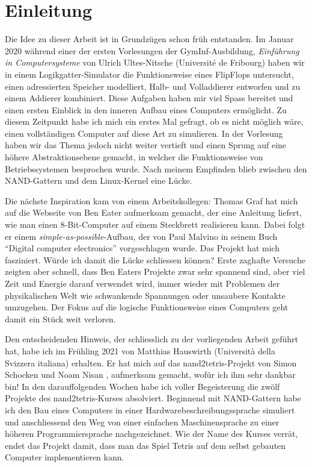 \section*{Einleitung}

Die Idee zu dieser Arbeit ist in Grundzügen schon früh entstanden. Im Januar 2020 während einer der ersten Vorlesungen der GymInf-Ausbildung, \textit{Einführung in Computersysteme} von Ulrich Ultes-Nitsche (Université de Fribourg) haben wir in einem Logikgatter-Simulator die Funktionsweise eines FlipFlops untersucht, einen adressierten Speicher modelliert, Halb- und Volladdierer entworfen und zu einem Addierer kombiniert. Diese Aufgaben haben mir viel Spass bereitet und einen ersten Einblick in den inneren Aufbau eines Computers ermöglicht. Zu diesem Zeitpunkt habe ich mich ein erstes Mal gefragt, ob es nicht möglich wäre, einen vollständigen Computer auf diese Art zu simulieren. In der Vorlesung haben wir das Thema jedoch nicht weiter vertieft und einen Sprung auf eine höhere Abstraktionsebene gemacht, in welcher die Funktionsweise von Betriebssystemen besprochen wurde. Nach meinem Empfinden blieb zwischen den NAND-Gattern und dem Linux-Kernel eine Lücke.

Die nächste Inspiration kam von einem Arbeitskollegen: Thomas Graf hat mich auf die Webseite von Ben Eater \cite{ben-eater} aufmerksam gemacht, der eine Anleitung liefert, wie man einen 8-Bit-Computer auf einem Steckbrett realisieren kann. Dabei folgt er einem \textit{simple-as-possible}-Aufbau, der von Paul Malvino in seinem Buch \enquote{Digital computer electronics} \cite{malvino} vorgeschlagen wurde. Das Projekt hat mich fasziniert. Würde ich damit die Lücke schliessen können? Erste zaghafte Versuche zeigten aber schnell, dass Ben Eaters Projekte zwar sehr spannend sind, aber viel Zeit und Energie darauf verwendet wird, immer wieder mit Problemen der physikalischen Welt wie schwankende Spannungen oder unsaubere Kontakte umzugehen. Der Fokus auf die logische Funktionsweise eines Computers geht damit ein Stück weit verloren. 

Den entscheidenden Hinweis, der schliesslich zu der vorliegenden Arbeit geführt hat, habe ich im Frühling 2021 von Matthias Hauswirth (Università della Svizzera italiana) erhalten. Er hat mich auf das nand2tetris-Projekt von Simon Schocken und Noam Nisan \cite{nand2tetris-url}, \cite{nand2tetris} aufmerksam gemacht, wofür ich ihm sehr dankbar bin! In den darauffolgenden Wochen habe ich voller Begeisterung die zwölf Projekte des nand2tetris-Kurses absolviert. Beginnend mit NAND-Gattern habe ich den Bau eines Computers in einer Hardwarebeschreibungssprache simuliert und anschliessend den Weg von einer einfachen Maschinensprache zu einer höheren Programmiersprache nachgezeichnet. Wie der Name des Kurses verrät, endet das Projekt damit, dass man das Spiel Tetris auf dem selbst gebauten Computer implementieren kann.

